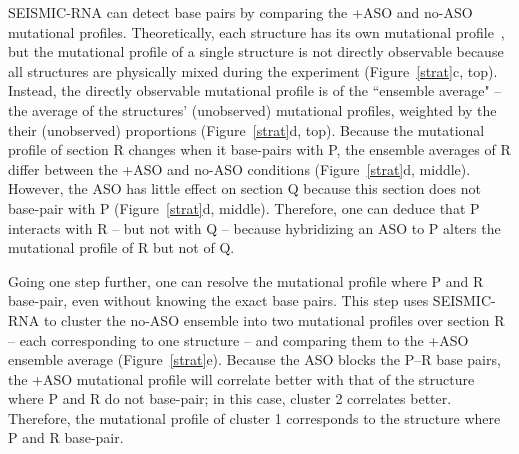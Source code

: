 \documentclass[main.tex]{subfiles}
\begin{document}
SEISMIC-RNA can detect base pairs by comparing the +ASO and no-ASO mutational profiles.
Theoretically, each structure has its own mutational profile~\cite{Sherpa2015}, but the mutational profile of a single structure is not directly observable because all structures are physically mixed during the experiment (Figure~\ref{strat}c, top).
Instead, the directly observable mutational profile is of the ``ensemble average" -- the average of the structures' (unobserved) mutational profiles, weighted by the their (unobserved) proportions (Figure~\ref{strat}d, top).
Because the mutational profile of section R changes when it base-pairs with P, the ensemble averages of R differ between the +ASO and no-ASO conditions (Figure~\ref{strat}d, middle).
However, the ASO has little effect on section Q because this section does not base-pair with P (Figure~\ref{strat}d, middle).
Therefore, one can deduce that P interacts with R -- but not with Q -- because hybridizing an ASO to P alters the mutational profile of R but not of Q.

Going one step further, one can resolve the mutational profile where P and R base-pair, even without knowing the exact base pairs.
This step uses SEISMIC-RNA to cluster the no-ASO ensemble into two mutational profiles over section R -- each corresponding to one structure -- and comparing them to the +ASO ensemble average (Figure~\ref{strat}e).
Because the ASO blocks the P--R base pairs, the +ASO mutational profile will correlate better with that of the structure where P and R do not base-pair; in this case, cluster 2 correlates better.
Therefore, the mutational profile of cluster 1 corresponds to the structure where P and R base-pair.
\end{document}

